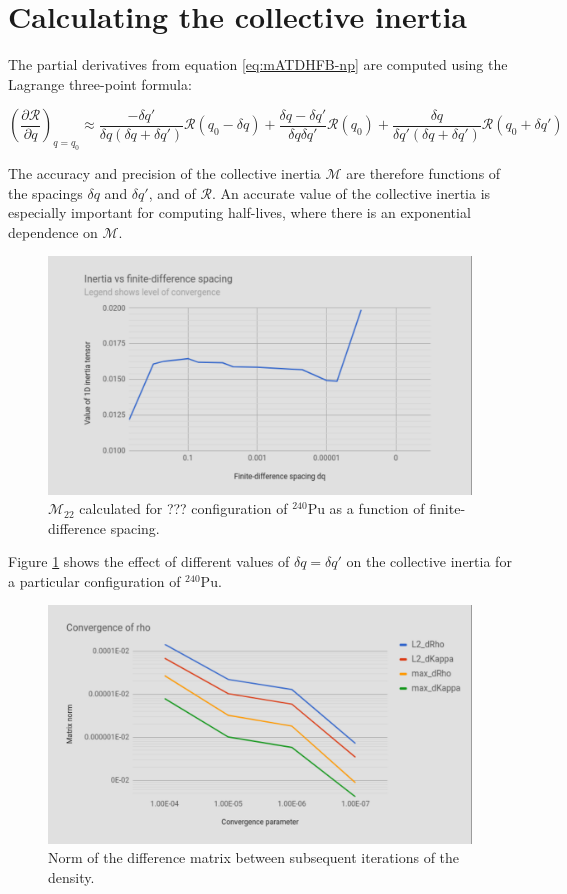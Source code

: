 \section{Calculating the collective inertia}
The partial derivatives from equation \ref{eq:mATDHFB-np} are computed using the Lagrange three-point formula:

\begin{equation}\label{eq:finite-diffs}
\left(\frac{\partial \mathcal{R}}{\partial q}\right)_{q=q_0} \approx 
    \frac{-\delta q'}{\delta q \left(\delta q + \delta q'\right)}\mathcal{R}(q_0-\delta q) + 
    \frac{\delta q - \delta q'}{\delta q \delta q'}\mathcal{R}(q_0) + 
    \frac{\delta q}{\delta q' \left(\delta q + \delta q'\right)}\mathcal{R}(q_0+\delta q')
\end{equation}

The accuracy and precision of the collective inertia $\mathcal{M}$ are therefore functions of the spacings $\delta q$ and $\delta q'$, and of $\mathcal{R}$. An accurate value of the collective inertia is especially important for computing half-lives, where there is an exponential dependence on $\mathcal{M}$.

\begin{figure}
	\centering
	\includegraphics[width=0.7\linewidth]{TeX_files/Num-dq_spacing}
	\caption[Collective inertia as a function of finite-difference spacing]{$\mathcal{M}_{22}$ calculated for ??? configuration of $^{240}$Pu as a function of finite-difference spacing.}
	\label{fig:num-dqspacing}
\end{figure}

Figure \ref{fig:num-dqspacing} shows the effect of different values of $\delta q = \delta q'$ on the collective inertia for a particular configuration of $^{240}$Pu.

\begin{figure}
	\centering
	\includegraphics[width=0.7\linewidth]{TeX_files/Num-rho_conv}
	\caption[Norm of the difference matrix between subsequent iterations of the density]{Norm of the difference matrix between subsequent iterations of the density.}
	\label{fig:num-rhoconv}
\end{figure}

